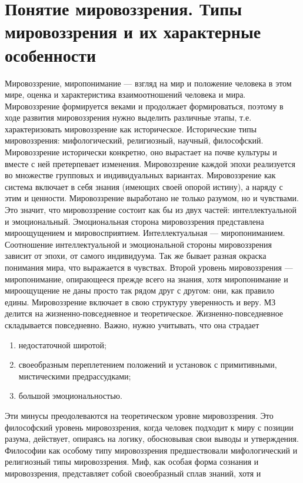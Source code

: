 \documentclass[12pt]{article}
\begin{document}
\section{Понятие мировоззрения. Типы мировоззрения и их характерные особенности}
Мировоззрение, миропонимание --- взгляд на мир и положение человека в этом мире, оценка и характеристика
взаимоотношений человека и мира. Мировоззрение формируется веками и продолжает формироваться, поэтому
в ходе развития мировоззрения нужно выделить различные этапы,
т.е. характеризовать мировоззрение как историческое. Исторические типы
мировоззрения: мифологический, религиозный, научный, философский. 
Мировоззрение   исторически  конкретно,  оно  вырастает  на  почве  культуры и вместе с ней претерпевает
изменения. Мировоззрение каждой эпохи реализуется во множестве групповых и индивидуальных  вариантах.
Мировоззрение  как
система включает в себя знания (имеющих своей опорой истину), а наряду с этим и ценности.
Мировоззрение выработано
не только разумом, но и чувствами. Это значит, что мировоззрение состоит как бы из двух частей:
интеллектуальной и эмоциональный.  Эмоциональная сторона  мировоззрения  представлена  мироощущением  и  мировосприятием.  Интеллектуальная ---  миропониманием.
Соотношение интеллектуальной и эмоциональной стороны мировоззрения зависит от эпохи,
от самого индивидуума. Так же бывает разная окраска
понимания мира, что выражается в чувствах. Второй уровень мировоззрения --- миропонимание, опирающееся прежде всего
на знания, хотя миропонимание и мироощущение не даны просто так рядом друг с другом: они,
как правило едины. Мировоззрение включает в
свою структуру уверенность и веру. МЗ делится на жизненно-повседневное и теоретическое. 
Жизненно-повседневное складывается повседневно. Важно, нужно учитывать, что она страдает
\begin{enumerate}
\item недостаточной широтой;
\item своеобразным переплетением 
положений и установок с примитивными, мистическими предрассудками;
\item большой эмоциональностью.
\end{enumerate}
Эти
минусы преодолеваются на теоретическом уровне мировоззрения. Это философский уровень мировоззрения,
когда человек подходит к миру с позиции разума, действует, опираясь на логику, обосновывая свои выводы и
утверждения.
Философии как особому типу мировоззрения предшествовали мифологический и религиозный типы мировоззрения.
Миф, как особая форма сознания и мировоззрения, представляет собой своеобразный сплав знаний, хотя и
\end{document}
